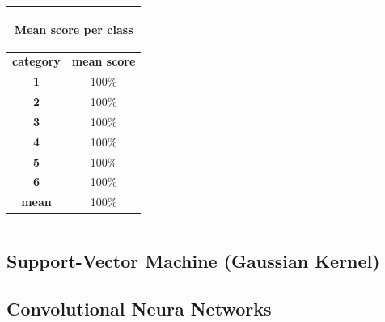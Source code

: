 \documentclass[c]{beamer}
\begin{document}
\begin{frame}
\begin{columns}
\begin{column}{0.5\textwidth}
\begin{overlayarea}{\linewidth}{2cm}
\begin{table}
\begin{center}
\begin{adjustbox}{max width=0.4\textwidth}
{\begin{tabular}{|c|c|}
      \multicolumn{2}{|c|}{\begin{bf}Mean score per class\end{bf}} \\
      \hline
      \textbf{category} & \textbf{mean score}\\
      \hline
      \textbf{1} & 100\% \\
      \hline
      \textbf{2} & 100\% \\
      \hline
      \textbf{3} & 100\% \\
      \hline
      \textbf{4} & 100\% \\
      \hline
      \textbf{5} & 100\% \\
      \hline
      \textbf{6} & 100\% \\
      \hline
      \textbf{mean} & 100\% \\
      \hline
    \end{tabular}
    }
    \end{adjustbox}
    \end{center}
  \end{table}
  \end{overlayarea}
\end{column}
\end{columns}
\end{frame}

\subsection{Support-Vector Machine (Gaussian Kernel)}

\subsection{Convolutional Neura Networks}
\end{document}
